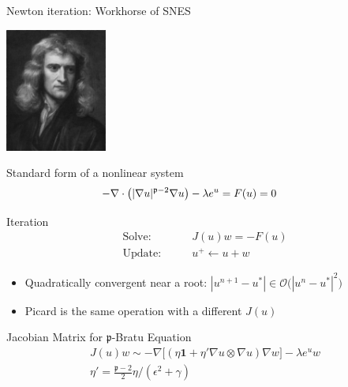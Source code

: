 \begin{frame}{Newton iteration: Workhorse of SNES}
  \begin{flushright}
    \includegraphics[width=0.25\textwidth]{figures/Newton}
  \end{flushright}
  \vspace*{-4cm}
  \begin{block}{Standard form of a nonlinear system}
    \[ \hspace*{-1cm} -\nabla \cdot \bigl(\vert\nabla u\vert^{\mathfrak{p}-2} \nabla u \bigr) - \lambda e^u = F(u) = 0 \]
  \end{block}
  
  \begin{block}{Iteration}
    \vspace*{-0.5cm}
    \begin{align*}
      \text{Solve:} & \qquad J(u) w = -F(u) \\
      \text{Update:} & \qquad u^+ \gets u + w
    \end{align*}
    \begin{itemize}
    \item Quadratically convergent near a root: $|u^{n+1}-u^*| \in \mathcal{O} \Big(|u^n-u^*|^2\Big)$
    \item Picard is the same operation with a different $J(u)$
    \end{itemize}
  \end{block}
  
  \begin{block}{Jacobian Matrix for $\mathfrak{p}$-Bratu Equation}
    \vspace*{-0.5cm}
        \begin{gather*}
         J(u) w \sim -\nabla \bigl[ (\eta {\mathbf{1}} + \eta' \nabla u \otimes \nabla u) \nabla w \bigr] - \lambda e^u w \\
          \eta' = \frac{\mathfrak{p}-2}{2} \eta / (\epsilon^2 + \gamma)
        \end{gather*}
  \end{block}
\end{frame}


